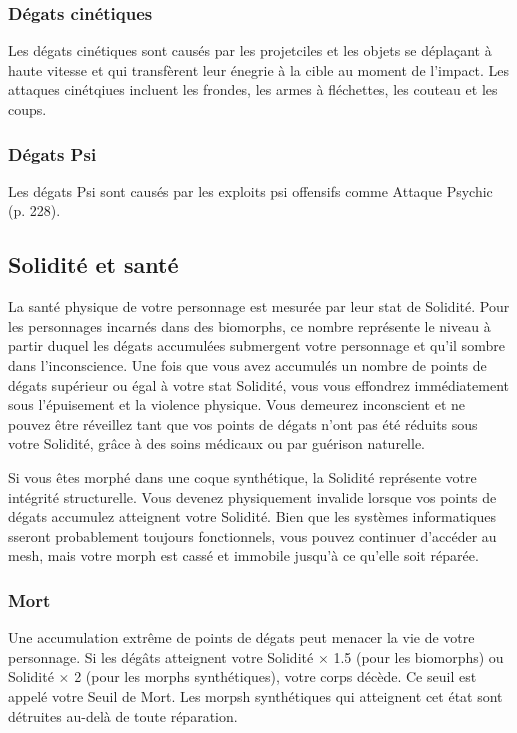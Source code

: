 \subsubsection{Dégats cinétiques} 

Les dégats cinétiques sont causés par les projetciles et les objets se déplaçant à haute vitesse et qui transfèrent leur énegrie à la cible au moment de l'impact. Les attaques cinétqiues incluent les frondes, les armes à fléchettes, les couteau et les coups. 

\subsubsection{Dégats Psi} 

Les dégats Psi sont causés par les exploits psi offensifs comme Attaque Psychic (p. 228). 

\subsection{Solidité et santé} \label{sec:durability-health} 

La santé physique de votre personnage est mesurée par leur stat de Solidité. Pour les personnages incarnés dans des biomorphs, ce nombre représente le niveau à partir duquel les dégats accumulées submergent votre personnage et qu'il sombre dans l'inconscience. Une fois que vous avez accumulés un nombre de points de dégats supérieur ou égal à votre stat Solidité, vous vous effondrez immédiatement sous l'épuisement et la violence physique. Vous demeurez inconscient et ne pouvez être réveillez tant que vos points de dégats n'ont pas été réduits sous votre Solidité, grâce à des soins médicaux ou par guérison naturelle. 

Si vous êtes morphé dans une coque synthétique, la Solidité représente votre intégrité structurelle. Vous devenez physiquement invalide lorsque vos points de dégats accumulez atteignent votre Solidité. Bien que les systèmes informatiques sseront probablement toujours fonctionnels, vous pouvez continuer d'accéder au mesh, mais votre morph est cassé et immobile jusqu'à ce qu'elle soit réparée. 

\subsubsection{Mort} 

Une accumulation extrême de points de dégats peut menacer la vie de votre personnage. Si les dégâts atteignent votre Solidité $\times$ 1.5 (pour les biomorphs) ou Solidité $\times$ 2 (pour les morphs synthétiques), votre corps décède. Ce seuil est appelé votre Seuil de Mort. Les morpsh synthétiques qui atteignent cet état sont détruites au-delà de toute réparation. 


